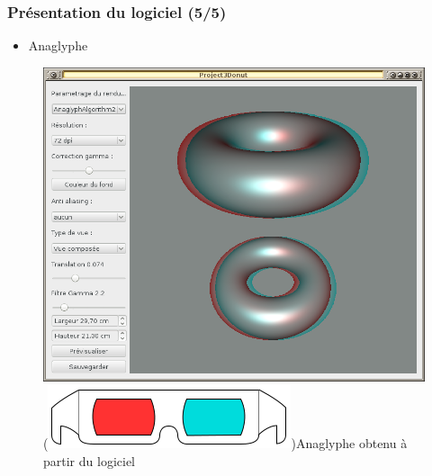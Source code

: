 \documentclass{beamer}
\begin{document}
%
\begin{frame}
\frametitle{Présentation du logiciel (5/5)}
\begin{itemize}[label=$\bullet$]
\item Anaglyphe
\end{itemize}
\begin{figure}
\centering
\includegraphics[scale=0.28]{renduanaglyphe.png}
\caption{(\includegraphics[scale=0.1]{lunettes.png})Anaglyphe obtenu à partir du logiciel}
\end{figure}
\end{frame}


\end{document}
